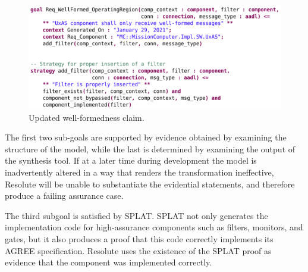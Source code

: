 \begin{figure}[h]
	\centering
	\includegraphics[width=1\columnwidth]{figs/resolute-add-filter.png}
	\caption{Updated well-formedness claim.} 
	\label{fig:resolute-add-filter} 
\end{figure}

The first two sub-goals are supported by evidence obtained by examining the structure of the model, while the last is determined by examining the output of the synthesis tool.  
If at a later time during development the model is inadvertently altered in a way that renders the transformation ineffective, Resolute will be unable to substantiate the evidential statements, and therefore produce a failing assurance case.

The third subgoal is satisfied by SPLAT.  SPLAT not only generates the implementation code for high-assurance components such as filters, monitors, and gates, but it also produces a proof that this code correctly implements its AGREE specification.  
Resolute uses the existence of the SPLAT proof as evidence that the component was implemented correctly.





